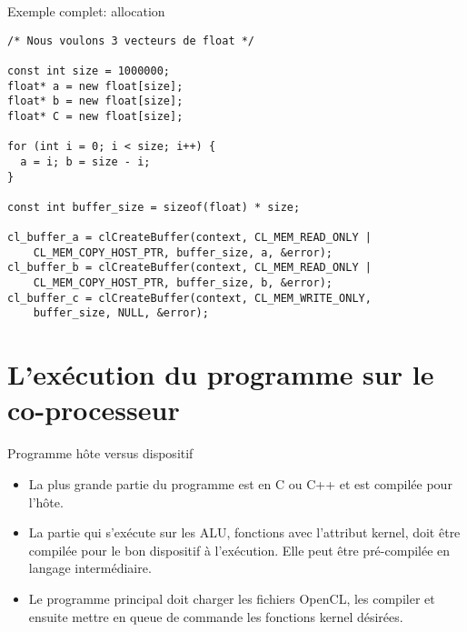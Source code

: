 \documentclass[10pt]{beamer}
\begin{document}
\begin{frame}[fragile]{Exemple complet: allocation}

  \scriptsize
  \begin{verbatim}
/* Nous voulons 3 vecteurs de float */

const int size = 1000000;
float* a = new float[size];
float* b = new float[size];
float* C = new float[size];

for (int i = 0; i < size; i++) {
  a = i; b = size - i;
}

const int buffer_size = sizeof(float) * size;

cl_buffer_a = clCreateBuffer(context, CL_MEM_READ_ONLY |
    CL_MEM_COPY_HOST_PTR, buffer_size, a, &error);
cl_buffer_b = clCreateBuffer(context, CL_MEM_READ_ONLY |
    CL_MEM_COPY_HOST_PTR, buffer_size, b, &error);
cl_buffer_c = clCreateBuffer(context, CL_MEM_WRITE_ONLY,
    buffer_size, NULL, &error);
  \end{verbatim}
\end{frame}

\section{L'exécution du programme sur le co-processeur}

\begin{frame}{Programme hôte versus dispositif}

  \begin{itemize}
    \item La plus grande partie du programme est en C ou C++ et est compilée pour l'hôte.

    \item La partie qui s'exécute sur les ALU, fonctions avec l'attribut kernel, doit être compilée pour le bon dispositif à l'exécution. Elle peut être pré-compilée en langage intermédiaire.

    \item Le programme principal doit charger les fichiers OpenCL, les compiler et ensuite mettre en queue de commande les fonctions kernel désirées.
  \end{itemize}
\end{frame}
\end{document}
